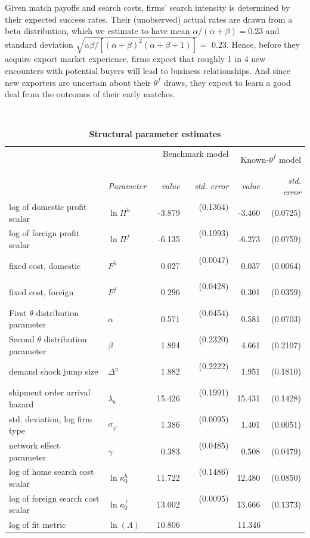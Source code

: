 \documentclass[12pt]{article}
\begin{document}
Given match payoffs and search costs, firms' search intensity is determined
by their expected success rates. Their (unobserved) actual rates are drawn
from a beta distribution, which we estimate to have mean $\alpha /(\alpha
+\beta )=0.23$ and standard deviation $\sqrt{\alpha \beta /\left[ (\alpha
+\beta )^{2}(\alpha +\beta +1)\right] }=$ $0.23$. Hence, before they acquire
export market experience, firms expect that roughly 1 in 4 new encounters
with potential buyers will lead to business relationships. And since new
exporters are uncertain about their $\theta ^{f}$ draws, they expect to
learn a good deal from the outcomes of their early matches.\ 

\begin{table}[tbp]
\caption{\textbf{Structural parameter estimates}}
\label{tab:struct_param}\centering
{\small \ }
\par
{\small 
\begin{tabular}{llrrrr}
\hline\hline
&  & \multicolumn{2}{r}{Benchmark model \ \ \ } & \multicolumn{2}{r}{Known-$%
\theta ^{f}$ model} \\ 
& \textit{Parameter} & \textit{value} & \textit{std. error} & \textit{value}
& \textit{std. error} \\ \cline{2-3}\cline{2-6}
log of domestic profit scalar & $\ln \Pi ^{h}$ & -3.879 & (0.1364) \ \  & 
-3.460 & (0.0725) \\ 
log of foreign profit scalar & $\ln \Pi ^{f}$ & -6.135 & (0.1993) \ \  & 
-6.273 & (0.0759) \\ 
fixed cost, domestic & $F^{h}$ & 0.027 & (0.0047) \ \  & 0.037 & (0.0064) \\ 
fixed cost, foreign & $F^{f}$ & 0.296 & (0.0428) \ \  & 0.301 & (0.0359) \\ 
First $\theta $ distribution parameter & $\alpha $ & 0.571 & (0.0454) \ \  & 
0.581 & (0.0703) \\ 
Second $\theta $ distribution parameter & $\beta $ & 1.894 & (0.2320) \ \  & 
4.661 & (0.2107) \\ 
demand shock jump size & $\Delta ^{y}$ & 1.882 & (0.2222) \ \  & 1.951 & 
(0.1810) \\ 
shipment order arrival hazard & $\lambda _{b}$ & 15.426 & (0.1991) \ \  & 
15.431 & (0.1428) \\ 
std. deviation, log firm type & $\sigma _{\varphi }$ & 1.386 & (0.0095) \ \ 
& 1.401 & (0.0051) \\ 
network effect parameter & $\gamma $ & 0.383 & (0.0485) \ \  & 0.508 & 
(0.0479) \\ 
log of home search cost scalar & $\ln \kappa _{0}^{h}$ & 11.722 & (0.1486) \
\  & 12.480 & (0.0850) \\ 
log of foreign search cost scalar & $\ln \kappa _{0}^{f}$ & 13.002 & 
(0.0095) \ \  & 13.666 & (0.1373) \\ \cline{3-6}
log of fit metric & $\ln (\Lambda )$ & \multicolumn{2}{r}{10.806 \ \ \ \ \ \
\ \ \ \ \ } & \multicolumn{2}{r}{11.346 \ \ \ \ \ \ \ \ \ } \\ \hline
\end{tabular}
}
\end{table}
\end{document}
